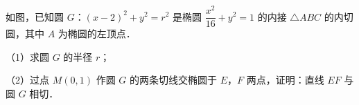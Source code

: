 \begingroup
\renewenvironment{question}{\Needspace{0.5\textheight}}{}
\begin{question}
如图，已知圆 $G$：$(x-2)^2+y^2=r^2$ 是椭圆 $\dfrac{x^2}{16}+y^2=1$ 的内接 $\triangle ABC$ 的内切圆，其中 $A$ 为椭圆的左顶点．

（1）求圆 $G$ 的半径 $r$；

（2）过点 $M(0,1)$ 作圆 $G$ 的两条切线交椭圆于 $E$，$F$ 两点，证明：直线 $EF$ 与圆 $G$ 相切．
\nopagebreak[4]
\begin{center}\end{center}
\nopagebreak[4]

\end{question}
\endgroup